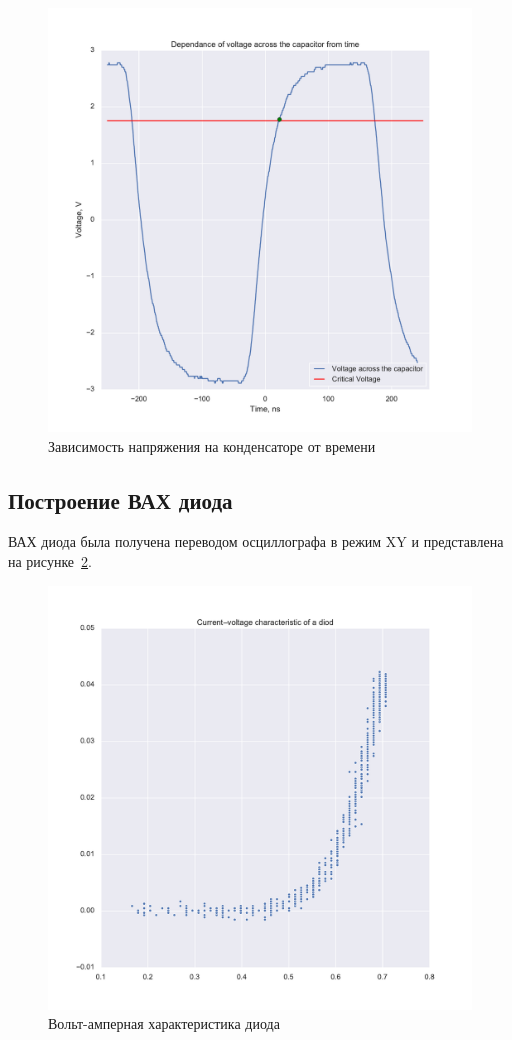 \documentclass[a4paper, 12pt]{article}
\begin{document}
\begin{figure}[h!]
	\center
	\includegraphics[width=0.9\linewidth]{Capacitor.pdf}
	\caption{Зависимость напряжения на конденсаторе от времени}
	\label{fig:capacitor}
\end{figure}

\subsection{Построение ВАХ диода}

ВАХ диода была получена переводом осциллографа в режим XY и представлена на рисунке~\ref{fig:vah}.

\begin{figure}[h!]
	\centering
	\includegraphics[width = \textwidth]{Vah.pdf}
	\caption{Вольт-амперная характеристика диода}
	\label{fig:vah}
\end{figure}
\end{document}
